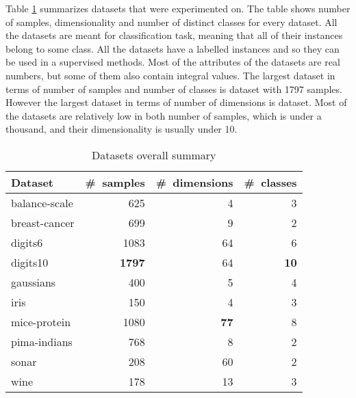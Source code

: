 \documentclass[12pt,a4paper]{report}
\begin{document}
Table \ref{tab:datasets} summarizes datasets that were experimented on. The table shows number of samples, dimensionality and number of distinct classes for every dataset. All the datasets are meant for classification task, meaning that all of their instances belong to some class. All the datasets have a labelled instances and so they can be used in a supervised methods. Most of the attributes of the datasets are real numbers, but some of them also contain integral values. The largest dataset in terms of number of samples and number of classes is  dataset with 1797 samples. However the largest dataset in terms of number of dimensions is  dataset. Most of the datasets are relatively low in both number of samples, which is under a thousand, and their dimensionality is usually under 10.

\begin{table}[ht] \centering
\begin{tabular}{lrrr}
\hline
Dataset & \#~samples & \#~dimensions & \#~classes \\
\hline
balance-scale           & 625   & 4    & 3  \\
breast-cancer           & 699   & 9    & 2  \\
digits6                 & 1083  & 64   & 6  \\
digits10                & \textbf{1797}  & 64  & \textbf{10} \\
gaussians               & 400   & 5   & 4  \\
iris                    & 150   & 4    & 3  \\
mice-protein            & 1080  & \textbf{77}   & 8  \\
pima-indians            & 768   & 8    & 2  \\
sonar                   & 208   & 60   & 2  \\
wine                    & 178   & 13   & 3  \\
\hline
\end{tabular}
\caption{Datasets overall summary} \label{tab:datasets}
\end{table}
\end{document}
